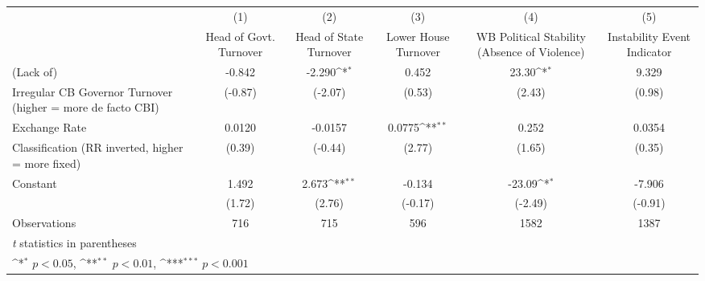 {
\def\sym#1{\ifmmode^{#1}\else\(^{#1}\)\fi}
\begin{tabular}{l*{5}{c}}
\toprule
                &\multicolumn{1}{c}{(1)}&\multicolumn{1}{c}{(2)}&\multicolumn{1}{c}{(3)}&\multicolumn{1}{c}{(4)}&\multicolumn{1}{c}{(5)}\\
                &\multicolumn{1}{c}{Head of Govt. Turnover}&\multicolumn{1}{c}{Head of State Turnover}&\multicolumn{1}{c}{Lower House Turnover}&\multicolumn{1}{c}{WB Political Stability (Absence of Violence)}&\multicolumn{1}{c}{Instability Event Indicator}\\
\midrule
(Lack of)       &   -0.842         &   -2.290\sym{*}  &    0.452         &    23.30\sym{*}  &    9.329         \\
Irregular CB Governor Turnover (higher = more de facto CBI)&  (-0.87)         &  (-2.07)         &   (0.53)         &   (2.43)         &   (0.98)         \\
\addlinespace
Exchange Rate   &   0.0120         &  -0.0157         &   0.0775\sym{**} &    0.252         &   0.0354         \\
Classification (RR inverted, higher = more fixed)&   (0.39)         &  (-0.44)         &   (2.77)         &   (1.65)         &   (0.35)         \\
\addlinespace
Constant        &    1.492         &    2.673\sym{**} &   -0.134         &   -23.09\sym{*}  &   -7.906         \\
                &   (1.72)         &   (2.76)         &  (-0.17)         &  (-2.49)         &  (-0.91)         \\
\midrule
Observations    &      716         &      715         &      596         &     1582         &     1387         \\
\bottomrule
\multicolumn{6}{l}{\footnotesize \textit{t} statistics in parentheses}\\
\multicolumn{6}{l}{\footnotesize \sym{*} \(p<0.05\), \sym{**} \(p<0.01\), \sym{***} \(p<0.001\)}\\
\end{tabular}
}
